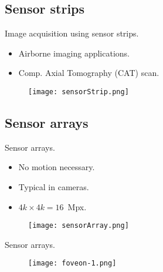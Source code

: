 
\subsection{Sensor strips}


\begin{frame}
Image acquisition using sensor strips.
\begin{itemize}
\item Airborne imaging applications.
\item Comp. Axial Tomography (CAT) scan.
\end{itemize}
\begin{figure}
\texttt{[image: sensorStrip.png]}
\end{figure}
\end{frame}


\subsection{Sensor arrays}


\begin{frame}
Sensor arrays.
\begin{itemize}
\item No motion necessary.
\item Typical in cameras.
\item $4k \times 4k = 16$~Mpx.
\end{itemize}
\begin{figure}
\texttt{[image: sensorArray.png]}
\end{figure}
\end{frame}


\begin{frame}
Sensor arrays.
\begin{figure}
\texttt{[image: foveon-1.png]}
\end{figure}
\end{frame}

